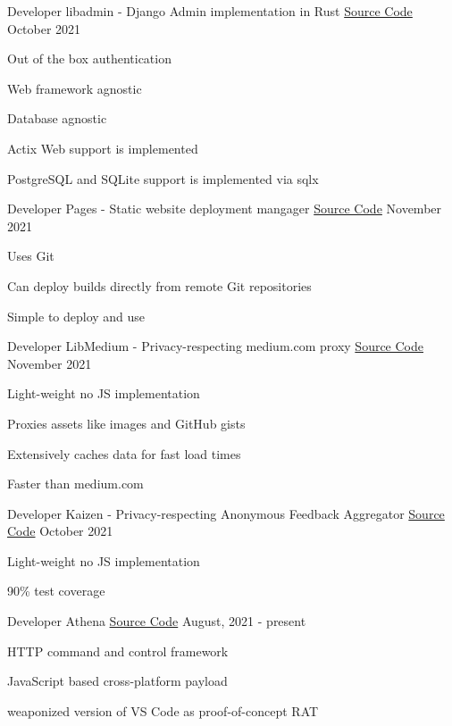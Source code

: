 
\begin{cventries}
  \cventry
	{Developer}
	{libadmin - Django Admin implementation in Rust}
	{\href{https://github.com/realaravinth/libadmin}{Source Code}}
	{October 2021}
	{
		\begin{cvitems}
			\item {Out of the box authentication}
			\item {Web framework agnostic}
			\item {Database agnostic}
			\item {Actix Web support is implemented}
			\item {PostgreSQL and SQLite support is implemented via sqlx}
		\end{cvitems}
	}

  \cventry
	{Developer}
	{Pages - Static website deployment mangager}
	{\href{https://github.com/realaravinth/pages}{Source Code}}
	{November 2021}
	{
		\begin{cvitems}
			\item {Uses Git}
			\item {Can deploy builds directly from remote Git repositories}
			\item {Simple to deploy and use}
		\end{cvitems}
	}

  \cventry
	{Developer}
	{LibMedium - Privacy-respecting medium.com proxy}
	{\href{https://github.com/realaravinth/libmedium}{Source Code}}
	{November 2021}
	{
		\begin{cvitems}
			\item {Light-weight no JS implementation}
			\item {Proxies assets like images and GitHub gists}
			\item {Extensively caches data for fast load times}
			\item {Faster than medium.com}
		\end{cvitems}
	}

  \cventry
	{Developer}
	{Kaizen - Privacy-respecting Anonymous Feedback Aggregator}
	{\href{https://github.com/realaravinth/kaizen}{Source Code}}
	{October 2021}
	{
		\begin{cvitems}
			\item {Light-weight no JS implementation}
			\item {90\% test coverage}
		\end{cvitems}
	}

  \cventry
    {Developer} %
    {Athena} %
    {\href{https://github.com/realaravinth/athena}{Source Code}} %
    {August, 2021 - present} %
    {
      \begin{cvitems} %
        \item {HTTP command and control framework}
        \item {JavaScript based cross-platform payload}
        \item {weaponized version of VS Code as proof-of-concept RAT}
      \end{cvitems}
    }
  

\end{cventries}
